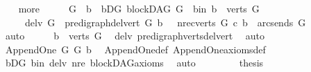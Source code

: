 \begin{isabellebody}
\ \ \isamarkupfalse%
\ more\isanewline
\ \ \isamarkupfalse%
\ \isamarkupfalse%
\ G{}\ \ b\ \ bD{\isacharunderscore}{\kern0pt}G{}{\isacharcolon}{\kern0pt}\ {\isachardoublequoteopen}blockDAG\ G{}{\isachardoublequoteclose}\ \ b{\isacharunderscore}{\kern0pt}in{\isacharcolon}{\kern0pt}\ {\isachardoublequoteopen}b\ {\isasymin}\ verts\ G{\isachardoublequoteclose}\isanewline
\ \ \ \ \ del{\isacharunderscore}{\kern0pt}v{\isacharcolon}{\kern0pt}\ {\isachardoublequoteopen}G{}\ {\isacharequal}{\kern0pt}\ pre{\isacharunderscore}{\kern0pt}digraph{\isachardot}{\kern0pt}del{\isacharunderscore}{\kern0pt}vert\ G\ b\ {\isachardoublequoteclose}\ \ nre{\isacharcolon}{\kern0pt}{\isachardoublequoteopen}{\isacharparenleft}{\kern0pt}{\isasymforall}c{\isasymin}verts\ G{\isachardot}{\kern0pt}\ {\isacharparenleft}{\kern0pt}c{\isacharcomma}{\kern0pt}\ b{\isacharparenright}{\kern0pt}\ {\isasymnotin}\ {\isacharparenleft}{\kern0pt}arcs{\isacharunderscore}{\kern0pt}ends\ G{\isacharparenright}{\kern0pt}\isactrlsup {\isacharplus}{\kern0pt}{\isacharparenright}{\kern0pt}{\isachardoublequoteclose}\isanewline
\ \ \ \ \isamarkupfalse%
\ auto\isanewline
\ \ \isamarkupfalse%
\ \isamarkupfalse%
\ {\isachardoublequoteopen}b\ {\isasymnotin}\ verts\ G{}{\isachardoublequoteclose}\ \isamarkupfalse%
\ del{\isacharunderscore}{\kern0pt}v\ pre{\isacharunderscore}{\kern0pt}digraph{\isachardot}{\kern0pt}verts{\isacharunderscore}{\kern0pt}del{\isacharunderscore}{\kern0pt}vert\ \isamarkupfalse%
\ auto\isanewline
\ \ \isamarkupfalse%
\ \isamarkupfalse%
\ {\isachardoublequoteopen}Append{\isacharunderscore}{\kern0pt}One\ G{}\ G\ b{\isachardoublequoteclose}\ \isamarkupfalse%
\ Append{\isacharunderscore}{\kern0pt}One{\isacharunderscore}{\kern0pt}def\ Append{\isacharunderscore}{\kern0pt}One{\isacharunderscore}{\kern0pt}axioms{\isacharunderscore}{\kern0pt}def\ \isanewline
\ \ \ \ \isamarkupfalse%
\ bD{\isacharunderscore}{\kern0pt}G{}\ b{\isacharunderscore}{\kern0pt}in\ del{\isacharunderscore}{\kern0pt}v\ nre\ blockDAG{\isacharunderscore}{\kern0pt}axioms\ \isamarkupfalse%
\ auto\ \ \ \isanewline
\ \ \isamarkupfalse%
\ \isamarkupfalse%
\ {\isacharquery}{\kern0pt}thesis\ \isamarkupfalse%

\end{isabellebody}
